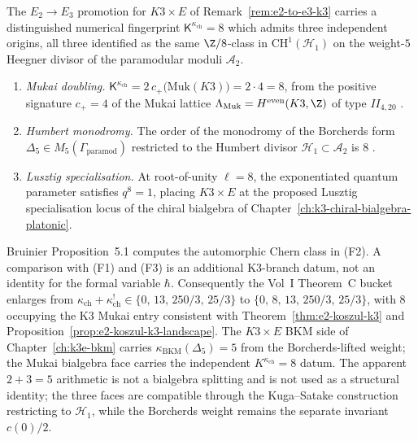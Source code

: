 \begin{remark}
\label{rem:e2-three-faces-of-eight}
The $E_2 \to E_3$ promotion for $K3 \times E$ of
Remark~\ref{rem:e2-to-e3-k3} carries a distinguished numerical fingerprint
$\mathsf{K}^{\kappa_{\mathrm{ch}}} = 8$ which admits three independent
origins, all three identified as the same $\Z/8$-class in
$\mathrm{CH}^1(\mathcal{H}_1)$ on the weight-$5$ Heegner divisor of the
paramodular moduli $\mathcal{A}_2$.
\begin{enumerate}[label=\textup{(F\arabic*)}]
 \item \emph{Mukai doubling.}
 $\mathsf{K}^{\kappa_{\mathrm{ch}}}
 = 2\,c_{+}\!\bigl(\mathrm{Muk}(K3)\bigr) = 2 \cdot 4 = 8$,
 from the positive signature $c_{+} = 4$ of the Mukai lattice
 $\Lambda_{\mathrm{Muk}} = H^{\mathrm{even}}(K3, \Z)$ of type
 $II_{4,20}$ \cite{Mukai1987}.
 \item \emph{Humbert monodromy.}
 The order of the monodromy of the Borcherds form
 $\Delta_5 \in M_5(\Gamma_{\mathrm{paramod}})$ restricted to the Humbert
 divisor $\mathcal{H}_1 \subset \mathcal{A}_2$ is $8$
 \cite{Bruinier2002}.
\item \emph{Lusztig specialisation.}
 At root-of-unity $\ell = 8$, the exponentiated quantum parameter
 satisfies \(q^8=1\), placing \(K3 \times E\) at the proposed Lusztig
 specialisation locus of the chiral bialgebra of
 Chapter~\ref{ch:k3-chiral-bialgebra-platonic}.
\end{enumerate}
Bruinier \cite{Bruinier2002} Proposition~5.1 computes the automorphic
Chern class in (F2). A comparison with (F1) and (F3) is an additional
K3-branch datum, not an identity for the formal variable \(\hbar\).
Consequently the Vol~I Theorem~C bucket enlarges from
$\kappa_{\mathrm{ch}} + \kappa_{\mathrm{ch}}^{!} \in
\{0,\,13,\,250/3,\,25/3\}$ to $\{0,\,8,\,13,\,250/3,\,25/3\}$,
with $8$ occupying the K3 Mukai entry consistent with
Theorem~\ref{thm:e2-koszul-k3} and
Proposition~\ref{prop:e2-koszul-k3-landscape}. The $K3 \times E$ BKM
side of Chapter~\ref{ch:k3e-bkm} carries
$\kappa_{\mathrm{BKM}}(\Delta_5) = 5$ from the Borcherds-lifted weight;
the Mukai bialgebra face carries the independent
$K^{\kappa_{\mathrm{ch}}}=8$ datum. The apparent $2+3=5$ arithmetic is
not a bialgebra splitting and is not used as a structural identity; the
three faces are compatible through the Kuga--Satake construction
restricting to $\mathcal{H}_1$, while the Borcherds weight remains the
separate invariant $c(0)/2$.
\end{remark}


